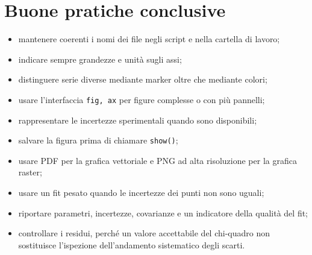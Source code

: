 \documentclass[11pt,a4paper]{book}
\begin{document}
\chapter{Buone pratiche conclusive}
\begin{itemize}
  \item mantenere coerenti i nomi dei file negli script e nella cartella di lavoro;
  \item indicare sempre grandezze e unità sugli assi;
  \item distinguere serie diverse mediante marker oltre che mediante colori;
  \item usare l'interfaccia \texttt{fig, ax} per figure complesse o con più pannelli;
  \item rappresentare le incertezze sperimentali quando sono disponibili;
  \item salvare la figura prima di chiamare \texttt{show()};
  \item usare PDF per la grafica vettoriale e PNG ad alta risoluzione per la grafica raster;
  \item usare un fit pesato quando le incertezze dei punti non sono uguali;
  \item riportare parametri, incertezze, covarianze e un indicatore della qualità del fit;
  \item controllare i residui, perché un valore accettabile del chi-quadro non sostituisce l'ispezione dell'andamento sistematico degli scarti.
\end{itemize}
\end{document}
